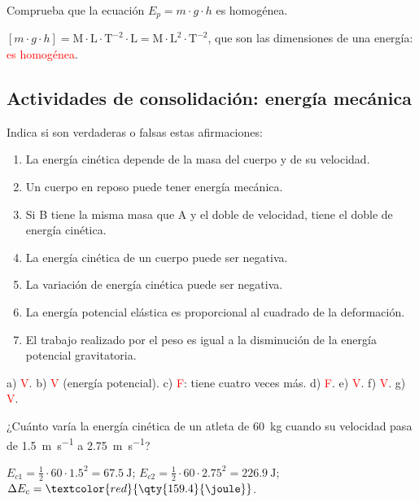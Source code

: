 \begin{exercise}
    Comprueba que la ecuación \(E_p = m \cdot g \cdot h\) es homogénea.
    \begin{solu}
        \([m \cdot g \cdot h] = \mathrm{M} \cdot \mathrm{L \cdot T^{-2}} \cdot \mathrm{L} = \mathrm{M \cdot L^2 \cdot T^{-2}}\), que son las dimensiones de una energía: \textcolor{red}{es homogénea}.
    \end{solu}
\end{exercise}

\subsection*{Actividades de consolidación: energía mecánica}

\begin{exercise}
    Indica si son verdaderas o falsas estas afirmaciones:
    \begin{enumerate}[label=\alph*)]
        \item La energía cinética depende de la masa del cuerpo y de su velocidad.
        \item Un cuerpo en reposo puede tener energía mecánica.
        \item Si B tiene la misma masa que A y el doble de velocidad, tiene el doble de energía cinética.
        \item La energía cinética de un cuerpo puede ser negativa.
        \item La variación de energía cinética puede ser negativa.
        \item La energía potencial elástica es proporcional al cuadrado de la deformación.
        \item El trabajo realizado por el peso es igual a la disminución de la energía potencial gravitatoria.
    \end{enumerate}
    \begin{solu}
        a) \textcolor{red}{V}. b) \textcolor{red}{V} (energía potencial). c) \textcolor{red}{F}: tiene cuatro veces más. d) \textcolor{red}{F}. e) \textcolor{red}{V}. f) \textcolor{red}{V}. g) \textcolor{red}{V}.
    \end{solu}
\end{exercise}

\begin{exercise}
    ¿Cuánto varía la energía cinética de un atleta de \qty{60}{\kg} cuando su velocidad pasa de \qty{1.5}{\m\per\s} a \qty{2.75}{\m\per\s}?
    \begin{solu}
        \(E_{c1} = \frac{1}{2} \cdot 60 \cdot \num{1.5}^2 = \qty{67.5}{\joule}\); \(E_{c2} = \frac{1}{2} \cdot 60 \cdot \num{2.75}^2 = \qty{226.9}{\joule}\); \(\Delta E_c = \textcolor{red}{\qty{159.4}{\joule}}\).
    \end{solu}
\end{exercise}

